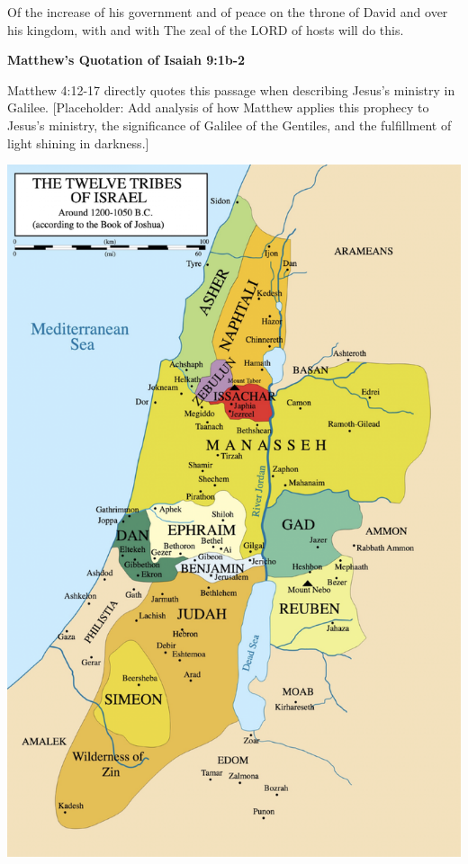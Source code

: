 \documentclass[11pt]{article}
\begin{document}
\begin{biblicaloutline}[Isaiah 9:1b-7]
\begin{versesection}{2em}
        { Of the increase of his government and of peace}
        {on the throne of David and over his kingdom,}
        {with  and with }
        {The zeal of the LORD of hosts will do this.}
    \end{versesection}

\end{biblicaloutline}

\vspace{3em}
{\large\bfseries Matthew's Quotation of Isaiah 9:1b-2}
\vspace{1em}

Matthew 4:12-17 directly quotes this passage when describing Jesus's ministry in Galilee. [Placeholder: Add analysis of how Matthew applies this prophecy to Jesus's ministry, the significance of Galilee of the Gentiles, and the fulfillment of light shining in darkness.]

\vspace{1em}
\begin{center}
\includegraphics[width=.75\textwidth]{image.png}
\end{center}
\vspace{1em}
\end{document}
